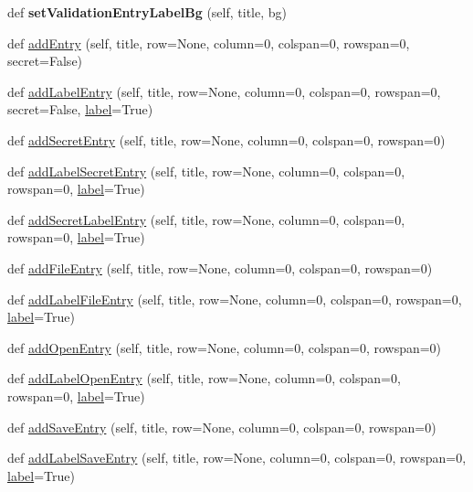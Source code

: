 \begin{DoxyCompactItemize}
\mbox{\label{classappjar_1_1gui_a9b38cbcbb468a38d6a51c9b09a910921}} 
def {\bfseries set\+Validation\+Entry\+Label\+Bg} (self, title, bg)
\item 
def \hyperlink{classappjar_1_1gui_a216740773803ceef3b97a57b12b3b863}{add\+Entry} (self, title, row=None, column=0, colspan=0, rowspan=0, secret=False)
\item 
def \hyperlink{classappjar_1_1gui_ae6139882373d7af863c862bd30d0b09c}{add\+Label\+Entry} (self, title, row=None, column=0, colspan=0, rowspan=0, secret=False, \hyperlink{classappjar_1_1gui_a161659a9096715ced2da924ab88ddecc}{label}=True)
\item 
def \hyperlink{classappjar_1_1gui_a381f2ac572caacb5cf15205a5ef22a3b}{add\+Secret\+Entry} (self, title, row=None, column=0, colspan=0, rowspan=0)
\item 
def \hyperlink{classappjar_1_1gui_a3ad3ebbddda51b6115b2adae642980ce}{add\+Label\+Secret\+Entry} (self, title, row=None, column=0, colspan=0, rowspan=0, \hyperlink{classappjar_1_1gui_a161659a9096715ced2da924ab88ddecc}{label}=True)
\item 
def \hyperlink{classappjar_1_1gui_af51abc40152c99c140f32c5a693ccc40}{add\+Secret\+Label\+Entry} (self, title, row=None, column=0, colspan=0, rowspan=0, \hyperlink{classappjar_1_1gui_a161659a9096715ced2da924ab88ddecc}{label}=True)
\item 
def \hyperlink{classappjar_1_1gui_a78a624b2ea19a173f830ccca80806002}{add\+File\+Entry} (self, title, row=None, column=0, colspan=0, rowspan=0)
\item 
def \hyperlink{classappjar_1_1gui_ae3d8091593d454afa3953083aa079cf4}{add\+Label\+File\+Entry} (self, title, row=None, column=0, colspan=0, rowspan=0, \hyperlink{classappjar_1_1gui_a161659a9096715ced2da924ab88ddecc}{label}=True)
\item 
def \hyperlink{classappjar_1_1gui_af900fd83f5bfa65d4a96b68dcad976e8}{add\+Open\+Entry} (self, title, row=None, column=0, colspan=0, rowspan=0)
\item 
def \hyperlink{classappjar_1_1gui_a262ff9363b1c10e2a7c34f03b019ce19}{add\+Label\+Open\+Entry} (self, title, row=None, column=0, colspan=0, rowspan=0, \hyperlink{classappjar_1_1gui_a161659a9096715ced2da924ab88ddecc}{label}=True)
\item 
def \hyperlink{classappjar_1_1gui_a1cafce795a988b38ff98b78e5def5dfb}{add\+Save\+Entry} (self, title, row=None, column=0, colspan=0, rowspan=0)
\item 
def \hyperlink{classappjar_1_1gui_a0580477c94b8f68ac15b59f184a356b2}{add\+Label\+Save\+Entry} (self, title, row=None, column=0, colspan=0, rowspan=0, \hyperlink{classappjar_1_1gui_a161659a9096715ced2da924ab88ddecc}{label}=True)

\end{DoxyCompactItemize}
